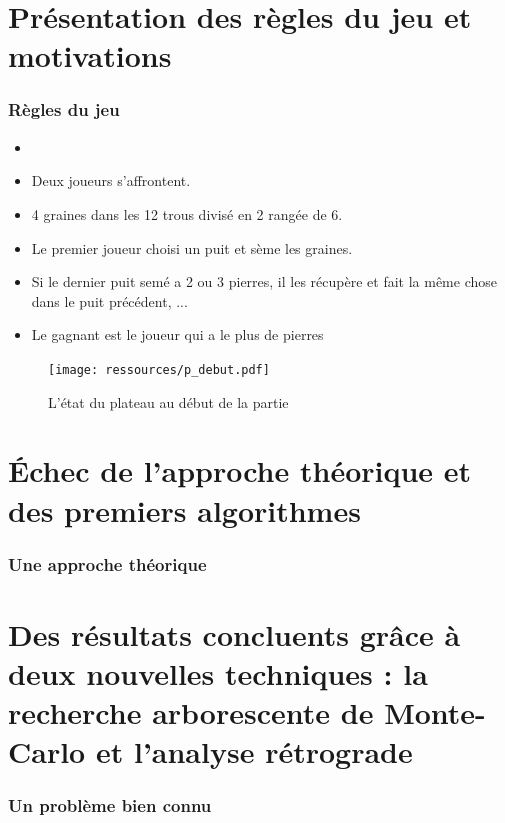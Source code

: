 \message{ !name(test.tex)}\documentclass{beamer}
\begin{document}
\section{Présentation des règles du jeu et motivations}
\begin{frame}
  \frametitle{Règles du jeu}
  \begin{minipage}[t]{0.5\linewidth}
    \begin{itemize}
    \item<Règles du jeu>
    \item Deux joueurs s'affrontent.
    \item 4 graines dans les 12 trous divisé en 2 rangée de 6.
    \item Le premier joueur choisi un puit et sème les graines.
    \item Si le dernier puit semé a 2 ou 3 pierres, il les récupère et fait la même chose dans le puit précédent, ...
      \item Le gagnant est le joueur qui a le plus de pierres
    \end{itemize}
  \end{minipage}
  \hfill 
  \begin{minipage}[t]{0.49\linewidth}
    \begin{figure}
      \centering
      \texttt{[image: ressources/p\_debut.pdf]}
      \caption{L'état du plateau au début de la partie}
    \end{figure}
    
  \end{minipage}
  
\end{frame}

\section{Échec de l'approche théorique et des premiers algorithmes}
\begin{frame}
  \frametitle{Une approche théorique}
  
\end{frame}

\section{Des résultats concluents grâce à deux nouvelles techniques : la recherche arborescente de Monte-Carlo et l'analyse rétrograde}
\begin{frame}
  \frametitle{Un problème bien connu}
  
\end{frame}
\end{document}

